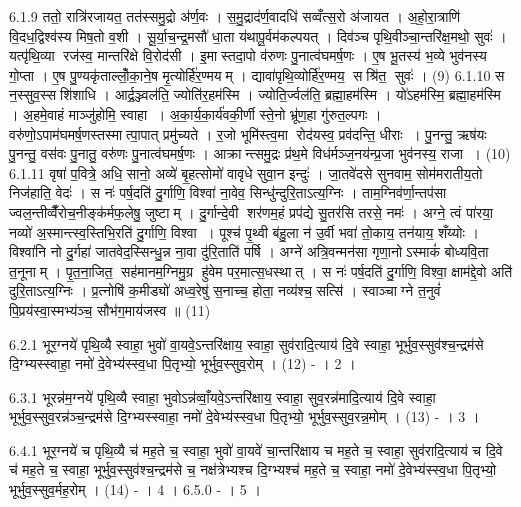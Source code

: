 6.1.9
ततो॒ रात्रि॑रजायत॒ तत॑स्समु॒द्रो अ॑र्ण॒वः । स॒मु॒द्राद॑र्ण॒वादधि॑ सव्वँत्स॒रो अ॑जायत । अ॒हो॒रा॒त्राणि॑ वि॒दध॒द्विश्व॑स्य मिष॒तो व॒शी । सू॒र्या॒च॒न्द्र॒मसौ॑ धा॒ता य॑थापू॒र्वम॑कल्पयत् । दिव॑ञ्च पृथि॒वीञ्चा॒न्तरि॑क्ष॒मथो॒ सुवः॑ । यत्पृ॑थि॒व्या रज॑स्व॒ मान्तरि॑क्षे वि॒रोद॑सी । इ॒मास्तदा॒पो व॑रुणः पु॒नात्व॑घमर्\mbox{}ष॒णः । ए॒ष भू॒तस्य॑ भ॒व्ये भुव॑नस्य गो॒प्ता । ए॒ष पु॒ण्यकृ॑ताल्लोँ॒का॒ने॒ष मृ॒त्योर्\mbox{}हि॑र॒ण्मयम् । द्यावा॑पृथि॒व्योर्\mbox{}हि॑र॒ण्मय॒ सश्रि॑त॒ सुवः॑ । (9)
6.1.10
स न॒स्सुव॒स्सशि॑शाधि । आर्द्र॒ञ्ज्वल॑ति॒ ज्योति॑र॒हम॑स्मि । ज्योति॒र्ज्वल॑ति॒ ब्रह्मा॒हम॑स्मि । यो॑ऽहम॑स्मि॒ ब्रह्मा॒हम॑स्मि । अ॒हमे॒वाहं माञ्जु॑होमि॒ स्वाहा । अ॒का॒र्य॒का॒र्य॑वकी॒र्णी स्ते॒नो भ्रू॑ण॒हा गु॑रुत॒ल्पगः । वरु॑णो॒ऽपाम॑घमर्\mbox{}ष॒णस्तस्मात्पा॒पात् प्रमु॑च्यते । र॒जो भूमि॑स्त्व॒मा रोद॑यस्व॒ प्रव॑दन्ति॒ धीराः । पु॒नन्तु॒ ऋष॑यः पु॒नन्तु॒ वस॑वः पु॒नातु॒ वरु॑णः पु॒नात्व॑घमर्\mbox{}ष॒णः । आक्रान्त्समु॒द्रः प्र॑थ॒मे विध॑र्मञ्ज॒नय॑न्प्र॒जा भुव॑नस्य॒ राजा । (10)
6.1.11
वृषा॑ प॒वित्रे॒ अधि॒ सानो॒ अव्ये॑ बृ॒हत्सोमो॑ वावृधे सुवा॒न इन्दुः॑ । जा॒तवे॑दसे सुनवाम॒ सोम॑मरातीय॒तो निज॑हाति॒ वेदः॑ । स नः॑ पर्\mbox{}ष॒दति॑ दु॒र्गाणि॒ विश्वा॑ ना॒वेव॒ सिन्धु॑न्दुरि॒ताऽत्य॒ग्निः । ताम॒ग्निव॑र्णा॒न्तप॑सा ज्वल॒न्तीव्वैँ॑रोच॒नीङ्क॑र्मफ॒लेषु॒ जुष्टाम् । दु॒र्गान्दे॒वी शर॑णम॒हं प्रप॑द्ये सु॒तर॑सि तरसे॒ नमः॑ । अग्ने॒ त्वं पा॑रया॒ नव्यो॑ अ॒स्मान्त्स्व॒स्तिभि॒रति॑ दु॒र्गाणि॒ विश्वा । पूश्च॑ पृ॒थ्वी ब॑हु॒ला न॑ उ॒र्वी भवा॑ तो॒काय॒ तन॑याय॒ शँय्योः । विश्वा॑नि नो दु॒र्गहा॑ जातवेद॒स्सिन्धु॒न्न ना॒वा दु॑रि॒ताति॑ पर्\mbox{}षि । अग्ने॑ अत्रि॒वन्मन॑सा गृणा॒नोऽस्माकं॑ बोध्यवि॒ता त॒नूनाम् । पृ॒त॒ना॒जित॒ सह॑मानम॒ग्निमु॒ग्र हु॑वेम पर॒मात्स॒धस्थात् । स नः॑ पर्\mbox{}ष॒दति॑ दु॒र्गाणि॒ विश्वा॒ क्षाम॑द्दे॒वो अति॑ दुरि॒ताऽत्य॒ग्निः । प्र॒त्नोषि॑ क॒मीड्यो॑ अध्व॒रेषु॑ स॒नाच्च॒ होता॒ नव्य॑श्च॒ सत्सि॑ । स्वाञ्चाग्ने त॒नुवं॑ पि॒प्रय॑स्वा॒स्मभ्य॑ञ्च॒ सौभ॑ग॒माय॑जस्व ॥ (11)
\anuvakamend


6.2.1
भूर॒ग्नये॑ पृथि॒व्यै स्वाहा॒ भुवो॑ वा॒यवे॒ऽन्तरि॑क्षाय॒ स्वाहा॒ सुव॑रादि॒त्याय॑ दि॒वे स्वाहा॒ भूर्भुव॒स्सुव॑श्च॒न्द्रम॑से दि॒ग्भ्यस्स्वाहा॒ नमो॑ दे॒वेभ्य॑स्स्व॒धा पि॒तृभ्यो॒ भूर्भुव॒स्सुव॒रोम् । (12) - । 2 ।
\anuvakamend

6.3.1
भूरन्न॑म॒ग्नये॑ पृथि॒व्यै स्वाहा॒ भुवोऽन्न॑व्वाँ॒यवे॒ऽन्तरि॑क्षाय॒ स्वाहा॒ सुव॒रन्न॑मादि॒त्याय॑ दि॒वे स्वाहा॒ भूर्भुव॒स्सुव॒रन्न॑ञ्च॒न्द्रम॑से दि॒ग्भ्यस्स्वाहा॒ नमो॑ दे॒वेभ्य॑स्स्व॒धा पि॒तृभ्यो॒ भूर्भुव॒स्सुव॒रन्न॒मोम् । (13) - । 3 ।
\anuvakamend

6.4.1
भूर॒ग्नये॑ च पृथि॒व्यै च॑ मह॒ते च॒ स्वाहा॒ भुवो॑ वा॒यवे॑ चा॒न्तरि॑क्षाय च मह॒ते च॒ स्वाहा॒ सुव॑रादि॒त्याय॑ च दि॒वे च॑ मह॒ते च॒ स्वाहा॒ भूर्भुव॒स्सुव॑श्च॒न्द्रम॑से च॒ नक्ष॑त्रेभ्यश्च दि॒ग्भ्यश्च॑ मह॒ते च॒ स्वाहा॒ नमो॑ दे॒वेभ्य॑स्स्व॒धा पि॒तृभ्यो॒ भूर्भुव॒स्सुव॒र्मह॒रोम् । (14) - । 4 ।
6.5.0
- । 5 ।
\anuvakamend

